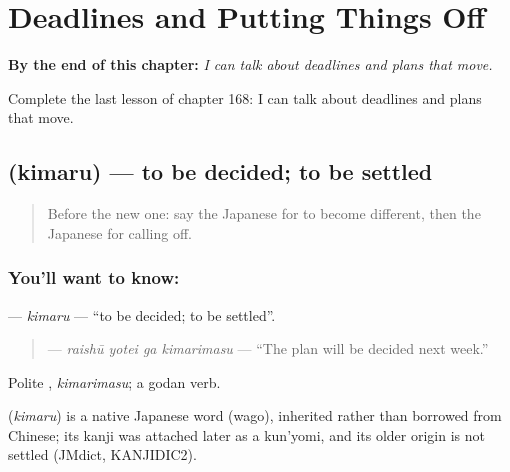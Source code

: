 
\chapter{Deadlines and Putting Things Off}
\label{ch:ja-deadlines-and-putting-things-off}

\begin{chapteropening}
\textbf{By the end of this chapter:} \emph{I can talk about deadlines and plans that move.}

Complete the last lesson of chapter 168: I can talk about deadlines and plans that move.
\end{chapteropening}

\section[\texorpdfstring{\ja{きまる} (kimaru)}{きまる (kimaru)}]{ (kimaru) — to be decided; to be settled}

\label{lesson:JA-C168-kimaru}



\begin{quote}
Before the new one: say the Japanese for to become different, then the Japanese for calling off.
\end{quote}

\subsection*{You'll want to know: }
\textbf{} — \emph{kimaru} — \textquotedblleft{}to be decided; to be settled\textquotedblright{}.

\begin{quote}
\textbf{  } — \emph{raishū yotei ga kimarimasu} — \textquotedblleft{}The plan will be decided next week.\textquotedblright{}
\end{quote}

Polite \textbf{}, \emph{kimarimasu}; a godan verb.

\begin{cousinweb}
\textbf{} (\emph{kimaru}) is a native Japanese word (wago), inherited rather than borrowed from Chinese; its kanji was attached later as a kun'yomi, and its older origin is not settled (JMdict, KANJIDIC2).
\end{cousinweb}

